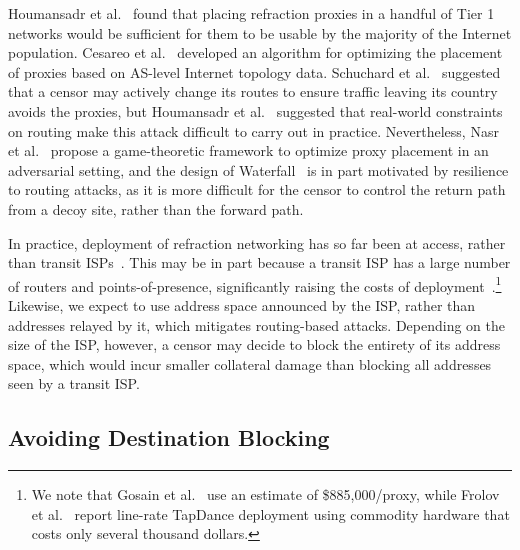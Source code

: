 Houmansadr et al.~\cite{cirripede11} found that placing refraction proxies in a 
handful of Tier 1 networks would be sufficient for them to be usable by the 
majority of the Internet population. Cesareo et al.~\cite{decoy-placement} 
developed an algorithm for optimizing the placement of proxies based on AS-level 
Internet topology data. Schuchard et al.~\cite{rad12} suggested that a censor may 
actively change its routes to ensure traffic leaving its country avoids the 
proxies, but Houmansadr et al.~\cite{true-cost-rad} suggested that real-world 
constraints on routing make this attack difficult to carry out in practice. 
Nevertheless, Nasr et al.~\cite{game-of-decoys} propose a game-theoretic 
framework to optimize proxy placement in an adversarial setting, and the 
design of Waterfall~\cite{waterfall17} is in part motivated by resilience to 
routing attacks, as it is more difficult for the censor to control the return 
path from a decoy site, rather than the forward path.

In practice, deployment of refraction networking has so far been at access, 
rather than transit ISPs~\cite{frolov2017isp}. This may be in part because a 
transit ISP has a large number of routers and points-of-presence, significantly 
raising the costs of deployment~\cite{devil-details}.\footnote{We
note that Gosain et al.~\cite{devil-details} use an estimate of \$885,000/proxy, 
while Frolov et al.~\cite{frolov2017isp} report line-rate TapDance deployment 
using commodity hardware that costs only several thousand dollars.} Likewise, 
we expect \scheme to use address space announced by the ISP, rather than 
addresses relayed by it, which mitigates routing-based attacks. Depending on 
the size of the ISP, however, a censor may decide to block the entirety of its 
address space, which would incur smaller collateral damage than blocking all 
addresses seen by a transit ISP.

\subsection{Avoiding Destination Blocking}

